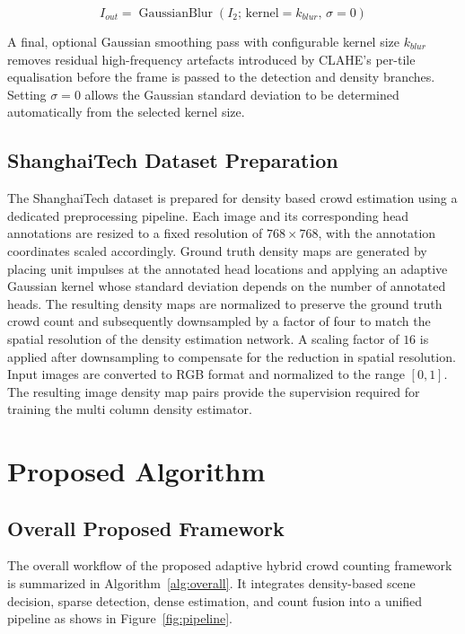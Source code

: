 \documentclass[12pt,a4paper]{report}
\begin{document}
\begin{equation}
	I_{out} =
	\operatorname{GaussianBlur}\left(
	I_{2};\,\text{kernel}=k_{blur},\,\sigma=0
	\right)
	\label{eq:gaussian-blur}
\end{equation}

A final, optional Gaussian smoothing pass with configurable kernel size $k_{blur}$ removes residual high-frequency artefacts introduced by CLAHE's per-tile equalisation before the frame is passed to the detection and density branches. Setting $\sigma=0$ allows the Gaussian standard deviation to be determined automatically from the selected kernel size.

\subsection{ShanghaiTech Dataset Preparation}

The ShanghaiTech dataset is prepared for density based crowd estimation using a dedicated preprocessing pipeline. Each image and its corresponding head annotations are resized to a fixed resolution of $768\times768$, with the annotation coordinates scaled accordingly. Ground truth density maps are generated by placing unit impulses at the annotated head locations and applying an adaptive Gaussian kernel whose standard deviation depends on the number of annotated heads. The resulting density maps are normalized to preserve the ground truth crowd count and subsequently downsampled by a factor of four to match the spatial resolution of the density estimation network. A scaling factor of $16$ is applied after downsampling to compensate for the reduction in spatial resolution. Input images are converted to RGB format and normalized to the range $[0,1]$. The resulting image density map pairs provide the supervision required for training the multi column density estimator.

\section{Proposed Algorithm}
\label{sec:proposed-algorithm}

\subsection{Overall Proposed Framework}

The overall workflow of the proposed adaptive hybrid crowd counting framework is summarized in Algorithm~\ref{alg:overall}. It integrates density-based scene decision, sparse detection, dense estimation, and count fusion into a unified pipeline as shows in Figure~\ref{fig:pipeline}.
\end{document}
